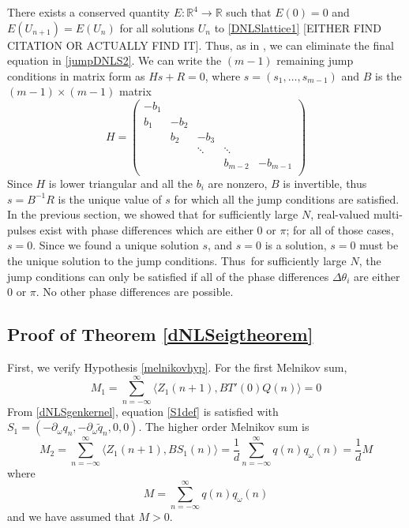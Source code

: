 \documentclass[12pt]{article}
\def\R{{\mathbb R}}
\begin{document}
There exists a conserved quantity $E: \R^4 \rightarrow \R$ such that $E(0) = 0$ and $E(U_{n+1}) = E(U_n)$ for all solutions $U_n$ to \eqref{DNLSlattice1} [EITHER FIND CITATION OR ACTUALLY FIND IT]. Thus, as in \cite{SandstedeStrut}, we can eliminate the final equation in \eqref{jumpDNLS2}. We can write the $(m-1)$ remaining jump conditions in matrix form as $H s + R = 0$, where $s = (s_1, \dots, s_{m-1})$ and $B$ is the $(m-1)\times(m-1)$ matrix
\[
H = \begin{pmatrix}
-b_1 \\
b_1 & -b_2 \\
& b_2 & -b_3 \\
&& \ddots & \ddots \\
&&& b_{m-2} & -b_{m-1} \\
\end{pmatrix}
\]
Since $H$ is lower triangular and all the $b_i$ are nonzero, $B$ is invertible, thus $s = B^{-1}R$ is the unique value of $s$ for which all the jump conditions are satisfied. In the previous section, we showed that for sufficiently large $N$, real-valued multi-pulses exist with phase differences which are either 0 or $\pi$; for all of those cases, $s = 0$. Since we found a unique solution $s$, and $s = 0$ is a solution, $s = 0$ must be the unique solution to the jump conditions. Thus\ for sufficiently large $N$, the jump conditions can only be satisfied if all of the phase differences $\Delta \theta_i$ are either 0 or $\pi$. No other phase differences are possible.

\subsection{Proof of Theorem \ref{dNLSeigtheorem}}

First, we verify Hypothesis \eqref{melnikovhyp}. For the first Melnikov sum,
\[
M_1 = \sum_{n=-\infty}^\infty \langle Z_1(n+1), B T'(0)Q(n) \rangle = 0
\]
From \eqref{dNLSgenkernel}, equation \eqref{S1def} is satisfied with $S_1 = (-\partial_\omega q_n, -\partial_\omega \tilde{q}_n, 0, 0)$. The higher order Melnikov sum is
\[
M_2 = \sum_{n=-\infty}^\infty \langle Z_1(n+1), B S_1(n) \rangle =
\frac{1}{d} \sum_{n=-\infty}^\infty q(n) q_\omega(n) = \frac{1}{d}M
\]
where
\[
M = \sum_{n=-\infty}^\infty q(n) q_\omega(n)
\]
and we have assumed that $M > 0$. 
\end{document}

